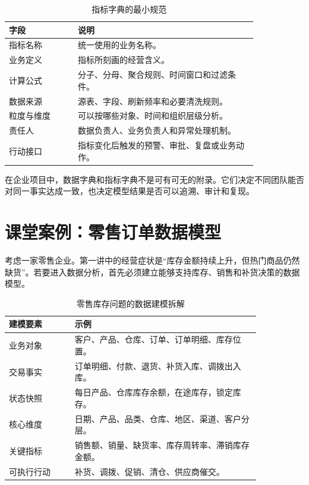 \documentclass[UTF8,fontset=fandol,openany,zihao=-4]{ctexbook}
\begin{document}
\begin{table}[htbp]
\centering
\caption{指标字典的最小规范}
\begin{tabular}{p{0.23\linewidth}p{0.60\linewidth}}
\toprule
字段 & 说明\\
\midrule
指标名称 & 统一使用的业务名称。\\
业务定义 & 指标所刻画的经营含义。\\
计算公式 & 分子、分母、聚合规则、时间窗口和过滤条件。\\
数据来源 & 源表、字段、刷新频率和必要清洗规则。\\
粒度与维度 & 可以按哪些对象、时间和组织层级分析。\\
责任人 & 数据负责人、业务负责人和异常处理机制。\\
行动接口 & 指标变化后触发的预警、审批、复盘或业务动作。\\
\bottomrule
\end{tabular}
\end{table}

在企业项目中，数据字典和指标字典不是可有可无的附录。它们决定不同团队能否对同一事实达成一致，也决定模型结果是否可以追溯、审计和复现。

\section{课堂案例：零售订单数据模型}

考虑一家零售企业。第一讲中的经营症状是“库存金额持续上升，但热门商品仍然缺货”。若要进入数据分析，首先必须建立能够支持库存、销售和补货决策的数据模型。

\begin{table}[htbp]
\centering
\caption{零售库存问题的数据建模拆解}
\begin{tabular}{p{0.22\linewidth}p{0.62\linewidth}}
\toprule
建模要素 & 示例\\
\midrule
业务对象 & 客户、产品、仓库、订单、订单明细、库存位置。\\
交易事实 & 订单明细、付款、退货、补货入库、调拨出入库。\\
状态快照 & 每日产品、仓库库存余额，在途库存，锁定库存。\\
核心维度 & 日期、产品、品类、仓库、地区、渠道、客户分层。\\
关键指标 & 销售额、销量、缺货率、库存周转率、滞销库存金额。\\
可执行行动 & 补货、调拨、促销、清仓、供应商催交。\\
\bottomrule
\end{tabular}
\end{table}
\end{document}
